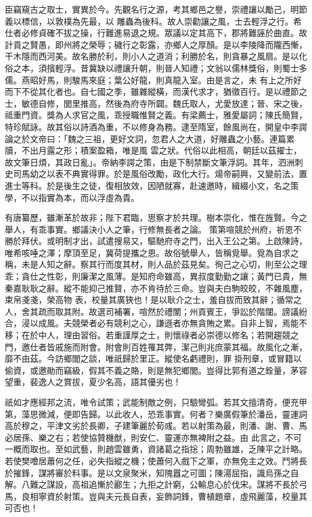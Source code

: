 \begin{pinyinscope}
 臣竊窺古之取士，實異於今。先觀名行之源，考其鄉邑之譽，崇禮讓以勵己，明節義以標信，以敦樸為先最，以
 雕蟲為後科。故人崇勸讓之風，士去輕浮之行。希仕者必修貞確不拔之操，行難進易退之規。眾議以定其高下，郡將難誣於曲直。故計貢之賢愚，即州將之榮辱；穢行之彰露，亦鄉人之厚顏。是以李陵降而隴西慚，干木隱而西河美。故名勝於利，則小人之道消；利勝於名，則貪暴之風扇。是以化俗之本，須擯輕浮。昔冀缺以禮讓升朝，則晉人知禮；文翁以儒林獎俗，則蜀士多儒。燕昭好馬，則駿馬來庭；葉公好龍，則真龍入室。由是言之，未
 有上之所好而下不從其化者也。自七國之季，雖雜縱橫，而漢代求才，猶徵百行。是以禮節之士，敏德自修，閭里推高，然後為府寺所闢。魏氏取人，尤愛放達；晉、宋之後，祗重門資。獎為人求官之風，乖授職惟賢之義。有梁薦士，雅愛屬詞；陳氏簡賢，特珍賦詠。故其俗以詩酒為重，不以修身為務。逮至隋室，餘風尚在，開皇中李諤論之於文帝曰：「魏之三祖，更好文詞，忽君人之大道，好雕蟲之小藝。連篇累牘，不出月露之形；積案盈箱，唯是風
 雲之狀。代俗以此相高，朝廷以茲擢士，故文筆日煩，其政日亂」。帝納李諤之策，由是下制禁斷文筆浮詞。其年，泗洲刺史司馬幼之以表不典實得罪。於是風俗改勵，政化大行。煬帝嗣興，又變前法，置進士等科。於是後生之徒，復相放效，因陋就寡，赴速邀時，緝綴小文，名之策學，不以指實為本，而以浮虛為貴。



 有唐纂歷，雖漸革於故非；陛下君臨，思察才於共理。樹本崇化，惟在旌賢。今之舉人，有乖事實。鄉議決小人之筆，行修無長者之論。
 策第喧競於州府，祈恩不勝於拜伏。或明制才出，試遣搜易又，驅馳府寺之門，出入王公之第。上啟陳詩，唯希咳唾之澤；摩頂至足，冀荷提攜之恩。故俗號舉人，皆稱覓舉。覓為自求之稱，未是人知之辭。察其行而度其材，則人品於茲見矣。徇己之心切，則至公之理乖；貪仕之性彰，則廉潔之風薄。是知府命雖高，異叔度勤勤之讓；黃門已貴，無秦嘉耿耿之辭。縱不能抑己推賢，亦不肯待於三命。豈與夫白駒皎皎，不雜風塵，束帛戔戔，榮高物
 表，校量其廣狹也！是以耿介之士，羞自拔而致其辭；循常之人，舍其疏而取其附。故選司補署，喧然於禮闈；州貢賓王，爭訟於階闥。謗議紛合，浸以成風。夫競榮者必有競利之心，謙遜者亦無貪賄之累。自非上智，焉能不移；在於中人，理由習俗。若重謹厚之士，則懷祿者必崇德以修名；若開趨競之門，邀仕者皆戚施而附會。附會則百姓罹其弊，潔己則兆庶蒙其福。故風化之漸，靡不由茲。今訪鄉閭之談，唯祇歸於里正。縱使名虧禮則，罪
 掛刑章，或冒籍以偷資，或邀勛而竊級，假其不義之賂，則是無犯鄉閭。豈得比郭有道之銓量，茅容望重，裴逸人之賞拔，夏少名高，語其優劣也！



 祇如才應經邦之流，唯令試策；武能制敵之例，只驗彎弧。若其文擅清奇，便充甲第，藻思微減，便即告歸。以此收人，恐乖事實。何者？樂廣假筆於潘岳，靈運詞高於穆之，平津文劣於長卿，子建筆麗於荀彧。若以射策為最，則潘、謝、曹、馬必居孫、樂之右；若使協贊機猷，則安仁、靈運亦無裨附之益。由
 此言之，不可一概而取也。至如武藝，則趙雲雖勇，資諸葛之指捴；周勃雖雄，乏陳平之計略。若使樊噲居蕭何之任，必失指縱之機；使蕭何入戲下之軍，亦無免主之效。鬥將長於摧鋒，謀將審於料事。是以文泉聚米，知隗囂之可圖；陳湯屈指，識烏孫之自解。八難之謀設，高祖追慚於酈生；九拒之計窮，公輸息心於伐宋。謀將不長於弓馬，良相寧資於射策。豈與夫元長自表，妄飾詞鋒，曹植題章，虛飛麗藻，校量其可否也！




\end{pinyinscope}
